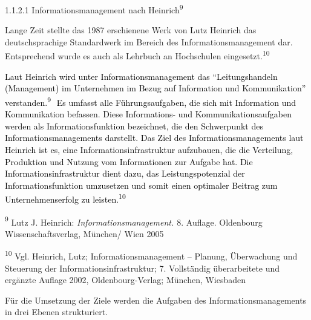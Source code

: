 \documentclass[a4paper]{article}
\begin{document}
\bigskip


\bigskip

{\sffamily\color{black}
1.1.2.1 Informationsmanagement nach Heinrich\textsuperscript{9}}

{\sffamily\color{black}
\newline
Lange Zeit stellte das 1987 erschienene Werk von Lutz Heinrich das deutschsprachige Standardwerk im Bereich des
Informationsmanagement dar. Entsprechend wurde es auch als Lehrbuch an Hochschulen eingesetzt.\textsuperscript{10}}


\bigskip

{\sffamily
\textcolor{black}{Laut Heinrich wird unter Informationsmanagement das “Leitungshandeln (Management) im Unternehmen im
Bezug auf Information und Kommunikation” verstanden.}\textcolor{black}{\textsuperscript{9 \ }}\textcolor{black}{Es
umfasst alle Führungsaufgaben, die sich mit Information und Kommunikation befassen. Diese Informations- und
Kommunikationsaufgaben werden als Informationsfunktion bezeichnet, die den Schwerpunkt des Informationsmanagements
darstellt. Das Ziel des Informationsmanagements laut Heinrich ist es, eine Informationsinfrastruktur aufzubauen, die
die Verteilung, Produktion und Nutzung vom Informationen zur Aufgabe hat. Die Informationsinfrastruktur dient dazu, das
Leistungspotenzial der Informationsfunktion umzusetzen und somit einen optimaler Beitrag zum Unternehmenserfolg zu
leisten.}\textcolor{black}{\textsuperscript{10}}\textcolor{black}{ }}


\bigskip


\bigskip


\bigskip


\bigskip


\bigskip

{\sffamily\color{black}
\textcolor[rgb]{0.14509805,0.14509805,0.14509805}{\textsuperscript{9}}\textcolor[rgb]{0.14509805,0.14509805,0.14509805}{
Lutz J. Heinrich: }\textit{\textcolor[rgb]{0.14509805,0.14509805,0.14509805}{Informationsmanagement.
}}\textcolor[rgb]{0.14509805,0.14509805,0.14509805}{8. Auflage. Oldenbourg Wissenschaftsverlag, München/ Wien 2005} }

{\sffamily\color{black}
\textsuperscript{10} Vgl. Heinrich, Lutz; Informationsmanagement – Planung, Überwachung und Steuerung der
Informationsinfrastruktur; 7. Vollständig überarbeitete und ergänzte Auflage 2002, Oldenbourg-Verlag; München,
Wiesbaden }

{\sffamily\color{black}
Für die Umsetzung der Ziele werden die Aufgaben des Informationsmanagements in drei Ebenen strukturiert.}
\end{document}
